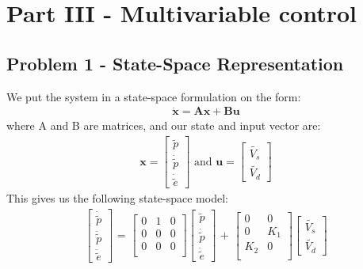 \section{Part III - Multivariable control}\label{sec:part3}
\subsection{Problem 1 - State-Space Representation}
We put the system in a state-space formulation on the form:
\begin{gather*}
    \mathbf{\dot{x}} = \mathbf{Ax} + \mathbf{Bu}
\end{gather*}
where A and B are matrices, and our state and input vector are: 
\begin{gather*}
    \mathbf{x} = 
    \begin{bmatrix}
        \tilde{p}\\\dot{\tilde{p}}\\\dot{\tilde{e}}
        \end{bmatrix}
     \text{  and  } \mathbf{u} = 
    \begin{bmatrix} \tilde{V_s}\\\tilde{V_d} \end{bmatrix}
\end{gather*}
This gives us the following state-space model:
\begin{gather*}
     \begin{bmatrix}
        \dot{\tilde{p}}\\\ddot{\tilde{p}}\\\ddot{\tilde{e}}
    \end{bmatrix}
    \text{ = } \begin{bmatrix}
        0 & 1 & 0 \\
        0 & 0 & 0 \\
        0 & 0 & 0 \\ \end{bmatrix}
    \begin{bmatrix}
         \tilde{p}\\\dot{\tilde{p}}\\\dot{\tilde{e}}
    \end{bmatrix}
    \text{ + } \begin{bmatrix}
        0 & 0 \\
        0 & K_1 \\
        K_2 & 0 \\
    \end{bmatrix}
    \begin{bmatrix} \tilde{V_s}\\\tilde{V_d} \end{bmatrix}
\end{gather*}


